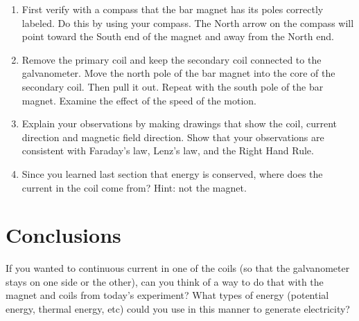 \begin{enumerate}[resume]
	 \item First verify with a compass that the bar magnet has its poles correctly labeled.  Do this by using your compass.  The North arrow on the compass will point toward the South end of the magnet and away from the North end.
	\item  Remove the primary coil and keep the secondary coil connected to the galvanometer.  Move the north pole of the bar magnet into the core of the secondary coil.  Then pull it out.  Repeat with the south pole of the bar magnet.  Examine the effect of the speed of the motion.  
	\item Explain your observations by making drawings that show the coil, current direction and magnetic field direction.  Show that your observations are consistent with Faraday's law, Lenz's law, and the Right Hand Rule.
	\item Since you learned last section that energy is conserved, where does the current in the coil come from?  Hint: not the magnet.
\end{enumerate}

\section{Conclusions}
If you wanted to continuous current in one of the coils (so that the galvanometer stays on one side or the other), can you think of a way to do that with the magnet and coils from today's experiment?  What types of energy (potential energy, thermal energy, etc) could you use in this manner to generate electricity?
 

\endinput
